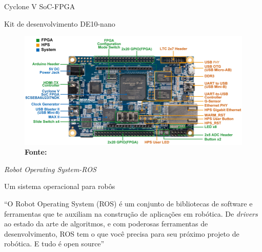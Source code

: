 \documentclass[10pt]{beamer}
\begin{document}
\begin{frame}{Cyclone V SoC-FPGA}
	\begin{alertblock}{Kit de desenvolvimento DE10-nano}
		\begin{figure}[h]
			\begin{center}
				\includegraphics[scale=1.45]{imagens/de10nano.png}\\
				{\footnotesize \textbf{Fonte:}}
			\end{center}
			\label{fig:de10-nano}
		\end{figure}
	\end{alertblock}
\end{frame}

\begin{frame}{\textit{Robot Operating System-ROS}}
	\begin{alertblock}{Um sistema operacional para robôs}
		\vspace{0.1cm}
		\begin{justify}
			``O Robot Operating System (ROS) é um conjunto de bibliotecas de software e ferramentas que te auxiliam na construção de aplicações em robótica. De \textit{drivers} ao estado da arte de algoritmos, e com poderosas ferramentas de desenvolvimento, ROS tem o que você precisa para seu próximo projeto de robótica. E tudo é open source'' 
		\end{justify}
		

	\end{alertblock}
\end{frame}
\end{document}
